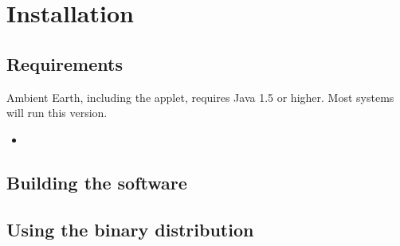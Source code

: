 \chapter{\label{cpt:usage:installation}Installation}

\section{Requirements}

Ambient Earth, including the applet, requires Java 1.5 or higher. Most systems
will run this version.

\begin{itemize}
    \item 
\end{itemize}

\section{Building the software}

\section{Using the binary distribution}

